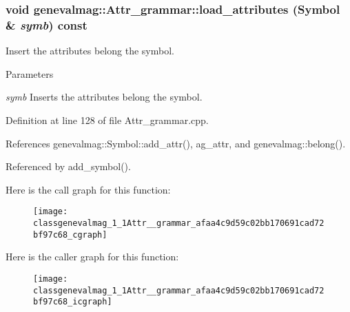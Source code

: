 \hypertarget{classgenevalmag_1_1Attr__grammar_afaa4c9d59c02bb170691cad72bf97c68}{
\subsubsection[{load\_\-attributes}]{\setlength{\rightskip}{0pt plus 5cm}void genevalmag::Attr\_\-grammar::load\_\-attributes ({\bf Symbol} \& {\em symb}) const}}
\label{classgenevalmag_1_1Attr__grammar_afaa4c9d59c02bb170691cad72bf97c68}
Insert the attributes belong the symbol. 
\begin{DoxyParams}{Parameters}
\item[{\em symb}]Inserts the attributes belong the symbol. \end{DoxyParams}


Definition at line 128 of file Attr\_\-grammar.cpp.



References genevalmag::Symbol::add\_\-attr(), ag\_\-attr, and genevalmag::belong().



Referenced by add\_\-symbol().



Here is the call graph for this function:\nopagebreak
\begin{figure}[H]
\begin{center}
\leavevmode
\texttt{[image: classgenevalmag\_1\_1Attr\_\_grammar\_afaa4c9d59c02bb170691cad72bf97c68\_cgraph]}
\end{center}
\end{figure}




Here is the caller graph for this function:\nopagebreak
\begin{figure}[H]
\begin{center}
\leavevmode
\texttt{[image: classgenevalmag\_1\_1Attr\_\_grammar\_afaa4c9d59c02bb170691cad72bf97c68\_icgraph]}
\end{center}
\end{figure}


